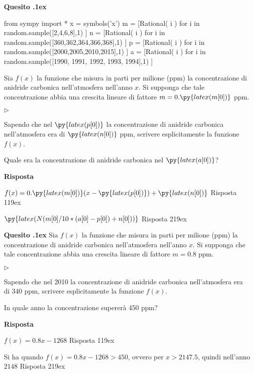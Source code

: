 \documentclass[11pt,twoside,a4paper]{article}
\newcommand{\mylabel}[1]{#1\hfill}
\renewenvironment{itemize}
  {\begin{list}{$\triangleright$}{%
   \setlength{\parskip}{0mm}
   \setlength{\topsep}{.4\baselineskip}
   \setlength{\rightmargin}{0mm}
   \setlength{\listparindent}{0mm}
   \setlength{\itemindent}{0mm}
   \setlength{\labelwidth}{2ex}
   \setlength{\itemsep}{.4\baselineskip}
   \setlength{\parsep}{0mm}
   \setlength{\partopsep}{0mm}
   \setlength{\labelsep}{1ex}
   \setlength{\leftmargin}{\labelwidth+\labelsep}
   \let\makelabel\mylabel}}{%
   \end{list}\vspace*{-1.3mm}}
\newcounter{quesito}
\newenvironment{question}{\bigskip\addtocounter{quesito}{1}\bigskip\bigskip\par\textbf{Quesito \thequesito.\kern1ex}}{\vspace{\parskip}}
\newenvironment{answer}{\par\textbf{Risposta\quad}}{\vspace{\parskip}}
\begin{document}
\begin{question}
\begin{pycode}
from sympy import *
x = symbols('x')
m = [Rational( i ) for i in random.sample([2,4,6,8],1) ]
n = [Rational( i ) for i in random.sample([360,362,364,366,368],1) ]
p = [Rational( i ) for i in random.sample([2000,2005,2010,2015],1) ]
a = [Rational( i ) for i in random.sample([1990, 1991, 1992, 1993, 1994],1) ]
\end{pycode}
Sia $f(x)$ la funzione che misura in parti per milione (ppm) la concentrazione di anidride carbonica nell'atmosfera nell'anno $x$. Si supponga che tale concentrazione abbia una crescita lineare di fattore $m = 0.\py{latex(m[0])}$ ppm.
\begin{itemize}
\item[1.] Sapendo che nel $\py{latex(p[0])}$ la concentrazione di anidride carbonica nell'atmosfera era di $\py{latex(n[0])}$ ppm, scrivere esplicitamente la funzione $f(x)$.
\item[2.] Quale era la concentrazione di anidride carbonica nel $\py{latex(a[0])}$?
\end{itemize}
\begin{answer}

\smallskip
{\color{blue}
$f(x) = 0.\py{latex(m[0])} ( x - \py{latex(p[0])}) + \py{latex(n[0])}$
\hfill Risposta 1\kern19ex}

{\color{blue}
$\py{latex(N(m[0]/10*(a[0]-p[0])+n[0]))}$
\hfill Risposta 2\kern19ex}

\end{answer}
\end{question}
\begin{question}
Sia $f(x)$ la funzione che misura in parti per milione (ppm) la concentrazione di anidride carbonica nell'atmosfera nell'anno $x$. Si supponga che tale concentrazione abbia una crescita lineare di fattore $m = 0.8$ ppm.
\begin{itemize}
\item[1.] Sapendo che nel 2010 la concentrazione di anidride carbonica nell'atmosfera era di 340 ppm, scrivere esplicitamente la funzione $f(x)$.
\item[2.] In quale anno la concentrazione supererà 450 ppm?
\end{itemize}
\begin{answer}

\smallskip
{\color{blue}
$f(x) = 0.8 x - 1268$
\hfill Risposta 1\kern19ex}

Si ha quando $f(x) = 0.8x - 1268 > 450$, ovvero per $x > 2147.5$, quindi nell'anno
{\color{blue}
$2148$
\hfill Risposta 2\kern19ex}

\end{answer}
\end{question}
\end{document}

